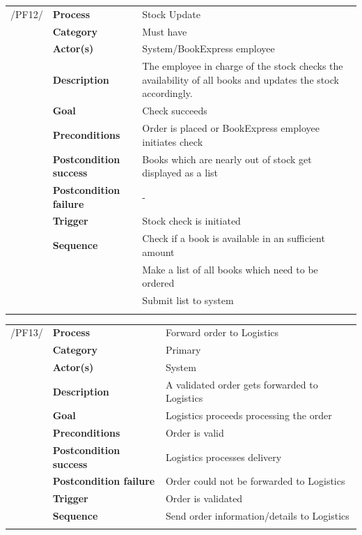 \documentclass[11pt,a4paper,oneside,svgnames]{report}
\begin{document}
\noindent
\begin{tabular}{p{1.5cm}p{3cm}p{8cm}}
	 /PF12/	& \textbf{Process} & Stock Update\\ 
		& \textbf{Category} & Must have\\
		& \textbf{Actor(s)} & System/BookExpress employee\\ 
		& \textbf{Description}	 & The employee in charge of the stock checks the availability of all books and updates the stock accordingly.\\ 
		& \textbf{Goal} & Check succeeds\\
		& \textbf{Preconditions} & Order is placed or BookExpress employee initiates check\\
		& \textbf{Postcondition success} & Books which are nearly out of stock get displayed as a list\\
		& \textbf{Postcondition failure} & -\\
		& \textbf{Trigger} & Stock check is initiated\\
		& \textbf{Sequence} & Check if a book is available in an sufficient amount\\
		& & Make a list of all books which need to be ordered\\
		& & Submit list to system\\
\hfill \\
\end{tabular}

\noindent
\begin{tabular}{p{1.5cm}p{3cm}p{8cm}}
	 /PF13/	& \textbf{Process} & Forward order to Logistics\\ 
		& \textbf{Category} & Primary\\
		& \textbf{Actor(s)} & System\\ 
		& \textbf{Description}	 & A validated order gets forwarded to Logistics\\ 
		& \textbf{Goal} & Logistics proceeds processing the order\\
		& \textbf{Preconditions} & Order is valid\\
		& \textbf{Postcondition success} & Logistics processes delivery\\
		& \textbf{Postcondition failure} & Order could not be forwarded to Logistics\\
		& \textbf{Trigger} & Order is validated\\
		& \textbf{Sequence} & Send order information/details to Logistics\\
\hfill \\
\end{tabular}
\end{document}
